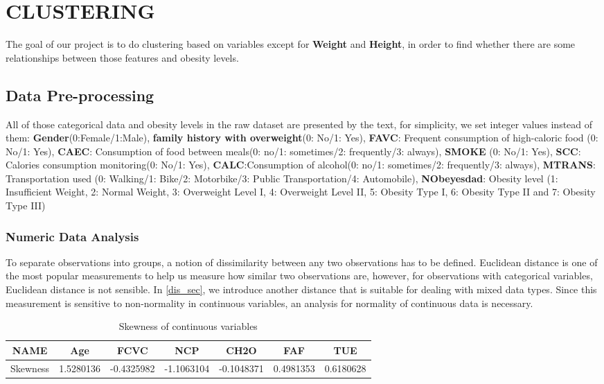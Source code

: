 \section{CLUSTERING}
The goal of our project is to do clustering based on variables except for \textbf{Weight} and \textbf{Height}, in order to find whether there are some relationships between those features and obesity levels. 
\subsection{Data Pre-processing}
All of those categorical data and obesity levels in the raw dataset are presented by the text, for simplicity, we set integer values instead of them: \textbf{Gender}(0:Female/1:Male), \textbf{family history with overweight}(0: No/1: Yes),\textbf{ FAVC}: Frequent consumption of high-caloric food (0: No/1: Yes), \textbf{CAEC}: Consumption of food between meals(0: no/1: sometimes/2: frequently/3: always), \textbf{SMOKE} (0: No/1: Yes), \textbf{SCC}: Calories consumption monitoring(0: No/1: Yes), \textbf{CALC}:Consumption of alcohol(0: no/1: sometimes/2: frequently/3: always), \textbf{MTRANS}: Transportation used (0: Walking/1: Bike/2: Motorbike/3: Public Transportation/4: Automobile), \textbf{NObeyesdad}: Obesity level (1: Insufficient Weight, 2: Normal Weight, 3: Overweight Level I, 4: Overweight Level II, 5: Obesity Type I, 6: Obesity Type II and 7: Obesity Type III)

\subsubsection{Numeric Data Analysis}
To separate observations into groups, a notion of dissimilarity between any two observations has to be defined. Euclidean distance is one of the most popular measurements to help us measure how similar two observations are, however, for observations with categorical variables, Euclidean distance is not sensible. In \ref{dis_sec}, we introduce another distance that is suitable for dealing with mixed data types. Since this measurement is sensitive to non-normality\cite{brown2012testing} in continuous variables, an analysis for normality of continuous data is necessary.
\begin{table}[!h]
\begin{center}
\begin{tabular}{ c| c | c |c |c |c |c }
\hline
    NAME  & Age & FCVC & NCP & CH2O & FAF & TUE \\
    \hline
 Skewness & 1.5280136 & -0.4325982 & -1.1063104& -0.1048371 & 0.4981353 & 0.6180628 \\
 \hline
\end{tabular}
\caption{\label{skew}Skewness of continuous variables}
\end{center}
\end{table}

